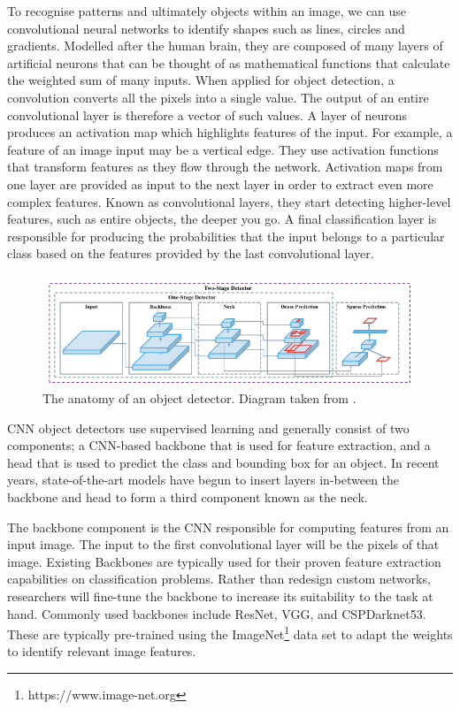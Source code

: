 \documentclass{thesis}
\begin{document}
To recognise patterns and ultimately objects within an image, we can use convolutional neural networks to identify shapes such as lines, circles and gradients. Modelled after the human brain, they are composed of many layers of artificial neurons that can be thought of as mathematical functions that calculate the weighted sum of many inputs. When applied for object detection, a convolution converts all the pixels into a single value. The output of an entire convolutional layer is therefore a vector of such values. A layer of neurons produces an activation map which highlights features of the input. For example, a feature of an image input may be a vertical edge. They use activation functions that transform features as they flow through the network. Activation maps from one layer are provided as input to the next layer in order to extract even more complex features. Known as convolutional layers, they start detecting higher-level features, such as entire objects, the deeper you go. A final classification layer is responsible for producing the probabilities that the input belongs to a particular class based on the features provided by the last convolutional layer.

\begin{figure}[h]
    \centering
    \includegraphics[scale=0.6]{images/cnn-diagram.png}
    \caption{The anatomy of an object detector. Diagram taken from \cite{yolov4}.}
    \label{fig:cnn-diagram}
\end{figure}

CNN object detectors use supervised learning and generally consist of two components; a CNN-based backbone that is used for feature extraction, and a head that is used to predict the class and bounding box for an object. In recent years, state-of-the-art models have begun to insert layers in-between the backbone and head to form a third component known as the neck.

The backbone component is the CNN responsible for computing features from an input image. The input to the first convolutional layer will be the pixels of that image. Existing Backbones are typically used for their proven feature extraction capabilities on classification problems. Rather than redesign custom networks, researchers will fine-tune the backbone to increase its suitability to the task at hand. Commonly used backbones include ResNet, VGG, and CSPDarknet53\cite{zhu2021tphyolov5}. These are typically pre-trained using the ImageNet\footnote{https://www.image-net.org} data set to adapt the weights to identify relevant image features\cite{breakdown-yolo4}.
\end{document}
